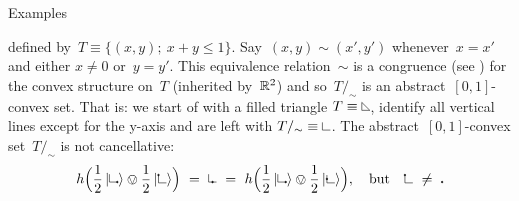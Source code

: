 \documentclass[b]{subfiles}
\begin{document}
\begin{parsec}
\begin{point}{Examples}
\begin{enumerate}
    defined by~$T \equiv \{ (x,y);\ x+y \leq 1\}$.
Say~$(x,y) \sim (x',y')$
    whenever~$x = x'$ and either $x\neq 0$ or~$y=y'$.
This equivalence relation~$\sim$
is a congruence (see ) for the convex structure on~$T$
    (inherited by~$\mathbb{R}^2$)
    and so~$T /_\sim$ is an abstract~$[0,1]$-convex set.
That is: we start of with a filled triangle
$T \equiv \begin{tikzpicture}[scale=0.2]
    \draw (0,0) -- (0,1) ; 
    \draw (1,0) -- (0,0) ; 
    \draw (1,0) -- (0,1) ; 
\end{tikzpicture}$,
identify all vertical lines
except for the y-axis
and are left with
$T/_\sim \equiv
\begin{tikzpicture}[scale=0.2]
    \draw (0,0) -- (0,1) ; 
    \draw (1,0) -- (0,0) ; 
\end{tikzpicture}$.
The abstract~$[0,1]$-convex set~$T/_\sim$
    is not cancellative:
\begin{equation*}
    h\Bigl( 
    \frac{1}{2}\ket{\begin{tikzpicture}[scale=0.2]
    \filldraw( 1,0) circle (3pt);
    \draw (0,0) -- (0,1) ; 
    \draw (1,0) -- (0,0) ; 
\end{tikzpicture}}
\ovee
    \frac{1}{2}\ket{\begin{tikzpicture}[scale=0.2]
    \filldraw( 0,1) circle (3pt);
    \draw (0,0) -- (0,1) ; 
    \draw (1,0) -- (0,0) ; 
\end{tikzpicture}} \Bigr)
\ = \
    \begin{tikzpicture}[scale=0.2]
    \filldraw( .5,0) circle (3pt);
    \draw (0,0) -- (0,1) ; 
    \draw (1,0) -- (0,0) ; 
\end{tikzpicture}
\ = \ 
h \Bigl(\frac{1}{2}\ket{\begin{tikzpicture}[scale=0.2]
    \filldraw( 1,0) circle (3pt);
    \draw (0,0) -- (0,1) ; 
    \draw (1,0) -- (0,0) ; 
\end{tikzpicture}}
\ovee
    \frac{1}{2}\ket{
        \begin{tikzpicture}[scale=0.2]
    \filldraw( 0,.5) circle (3pt);
    \draw (0,0) -- (0,1) ; 
    \draw (1,0) -- (0,0) ; 
\end{tikzpicture}
}\Bigr), \quad\text{but}\quad
        \begin{tikzpicture}[scale=0.2]
    \filldraw( 0,1) circle (3pt);
    \draw (0,0) -- (0,1) ; 
    \draw (1,0) -- (0,0) ; 
\end{tikzpicture} \ \neq \ 
        \begin{tikzpicture}[scale=0.2]
    \filldraw( 0,.5) circle (3pt);

\end{tikzpicture}
\end{equation*}
\end{enumerate}
\end{point}
\end{parsec}
\end{document}
